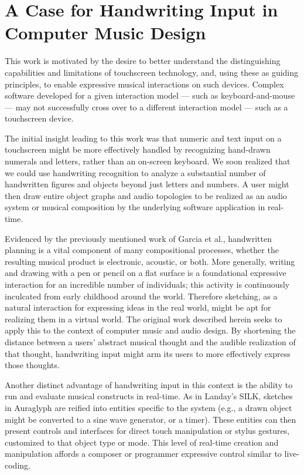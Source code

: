\documentclass{nime-alternate}
\begin{document}

%
%

\newpage
\section{A Case for Handwriting Input in Computer Music Design}
\label{sec:HandwrittenComputerMusic}

This work is motivated by the desire to better understand the distinguishing capabilities and limitations of touchscreen technology, and, using these as guiding principles, to enable expressive musical interactions on such devices. 
Complex software developed for a given interaction model --- such as keyboard-and-mouse --- may not successfully cross over to a different interaction model --- such as a touchscreen device. 

The initial insight leading to this work was that numeric and text input on a touchscreen might be more effectively handled by recognizing hand-drawn numerals and letters, rather than an on-screen keyboard. 
We soon realized that we could use handwriting recognition to analyze a substantial number of handwritten figures and objects beyond just letters and numbers. 
A user might then draw entire object graphs and audio topologies to be realized as an audio system or musical composition by the underlying software application in real-time. 

Evidenced by the previously mentioned work of Garcia et al., handwritten planning is a vital component of many compositional processes, whether the resulting musical product is electronic, acoustic, or both. 
More generally, writing and drawing with a pen or pencil on a flat surface is a foundational expressive interaction for an incredible number of individuals; this activity is continuously inculcated from early childhood around the world. 
Therefore sketching, as a natural interaction for expressing ideas in the real world, might be apt for realizing them in a virtual world. 
The original work described herein seeks to apply this to the context of computer music and audio design. 
By shortening the distance between a users' abstract musical thought and the audible realization of that thought, handwriting input might arm its users to more effectively express those thoughts. 

Another distinct advantage of handwriting input in this context is the ability to run and evaluate musical constructs in real-time. 
As in Landay's SILK, sketches in Auraglyph are reified into entities specific to the system (e.g., a drawn object might be converted to a sine wave generator, or a timer). 
These entities can then present controls and interfaces for direct touch manipulation or stylus gestures, customized to that object type or mode. 
This level of real-time creation and manipulation affords a composer or programmer expressive control similar to live-coding. 
\end{document}
